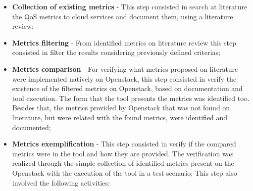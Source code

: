 \documentclass[conference]{IEEEtran}
\begin{document}
\begin{itemize}
 
 \item \textbf{Collection of existing metrics} - This step consisted in search at literature the QoS metrics to cloud services and document them, using a literature review;

  
 \item \textbf{Metrics filtering} - From identified metrics on literature review this step consisted in
 filter the results considering previously defined criterias;



  \item \textbf{Metrics comparison} - For verifying what metrics proposed on literature were implemented natively
  on Openstack, this step consisted in verify the existence of the filtered metrics on Openstack, based on documentation and tool execution. The form that the tool presents the metrics was identified too. Besides that, the metrics provided by Openstack that was not found on literature, but were related with the found metrics, were identified and documented;
 
 \item \textbf{Metrics exemplification} - This step consisted in verify if the compared metrics were in
 the tool and how they are provided. The verification was realized through the simple collection of identified metrics present on the Openstack with the execution of the tool in a test scenario;
 This step also involved the following activities:


\end{itemize}
\end{document}
